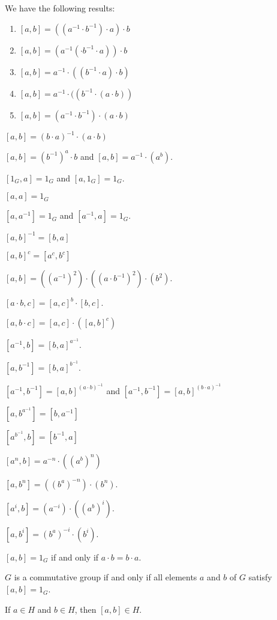 \documentclass{article}
\begin{document}
\begin{thm}
\item\label{group5:16} We have the following results:
  \begin{enumerate}[label=(\roman*)]
  \item $[a,b]=((a^{-1}\cdot b^{-1})\cdot a)\cdot b$
  \item $[a,b]=(a^{-1}(\cdot b^{-1}\cdot a))\cdot b$
  \item $[a,b]=a^{-1}\cdot((b^{-1}\cdot a)\cdot b)$
  \item $[a,b]=a^{-1}\cdot((b^{-1}\cdot (a\cdot b))$
  \item $[a,b]=(a^{-1}\cdot b^{-1})\cdot (a\cdot b)$
  \end{enumerate}
\item\label{group5:17} $[a,b]=(b\cdot a)^{-1}\cdot(a\cdot b)$
\item\label{group5:18} $[a,b]=(b^{-1})^{a}\cdot b$ and $[a,b]=a^{-1}\cdot(a^{b})$.
\item\label{group5:19} $[1_{G},a]=1_{G}$ and $[a,1_{G}]=1_{G}$.
\item\label{group5:20} $[a,a]=1_{G}$
\item\label{group5:21} $[a,a^{-1}]=1_{G}$ and $[a^{-1},a]=1_{G}$.
\item\label{group5:22} $[a,b]^{-1}=[b,a]$
\item\label{group5:23} $[a,b]^{c}=[a^{c},b^{c}]$
\item\label{group5:24} $[a,b] = ((a^{-1})^{2})\cdot((a\cdot b^{-1})^{2})\cdot(b^{2})$.
\item\label{group5:25} $[a\cdot b,c]=[a,c]^{b}\cdot[b,c]$.
\item\label{group5:26} $[a,b\cdot c]=[a,c]\cdot([a,b]^{c})$
\item\label{group5:27} $[a^{-1},b]=[b,a]^{a^{-1}}$.
\item\label{group5:28} $[a,b^{-1}]=[b,a]^{b^{-1}}$.
\item\label{group5:29} $[a^{-1},b^{-1}]=[a,b]^{(a\cdot b)^{-1}}$ and
  $[a^{-1},b^{-1}]=[a,b]^{(b\cdot a)^{-1}}$
\item\label{group5:30} $[a,b^{a^{-1}}]=[b,a^{-1}]$
\item\label{group5:31} $[a^{b^{-1}},b]=[b^{-1},a]$
\item\label{group5:32} $[a^{n},b]=a^{-n}\cdot((a^{b})^{n})$
\item\label{group5:33} $[a,b^{n}]=((b^{a})^{-n})\cdot(b^{n})$.
\item\label{group5:34} $[a^{i},b]=(a^{-i})\cdot((a^{b})^{i})$.
\item\label{group5:35} $[a,b^{i}]=(b^{a})^{-i}\cdot(b^{i})$.
\item\label{group5:36} $[a,b]=1_{G}$ if and only if $a\cdot b=b\cdot a$.
\item\label{group5:37} $G$ is a commutative group if and only if all
  elements $a$ and $b$ of $G$ satisfy $[a,b]=1_{G}$.
\item\label{group5:38} If $a\in H$ and $b\in H$, then $[a,b]\in H$.
\end{thm}
\end{document}
